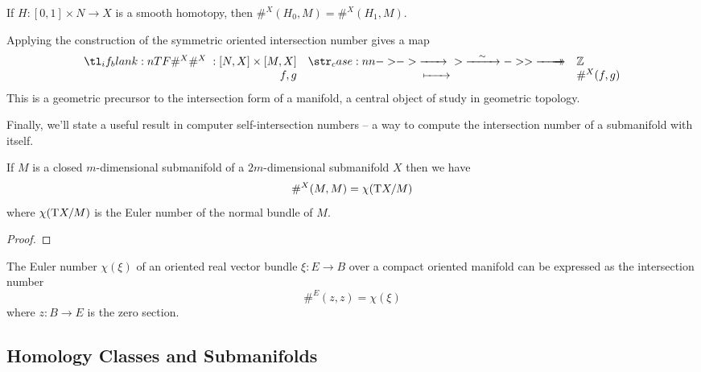 \begin{corollary}
	If $H : [0,1]\times N \to X$ is a smooth homotopy, then $\#^X(H_0, M) = \#^X(H_1, M)$.
\end{corollary}

Applying the construction of the symmetric oriented intersection number gives a map
\begin{equation}\label{eq:oriented-intersection-number-homotopy}
	\lkxfunc{\#^X}{[N,X]\times [M,X]}{\Z}{f,g}{\#^X(f,g)}
\end{equation}
This is a geometric precursor to the intersection form of a manifold, a central object of study in geometric topology. 

Finally, we'll state a useful result in computer self-intersection numbers -- a way to compute the intersection number of a submanifold with itself.

\begin{theorem}\label{thm:euler-number-self-intersection}
	If $M$ is a closed $m$-dimensional submanifold of a $2m$-dimensional submanifold $X$ then we have
	\[
		\#^X(M, M) = \chi(\mathrm{T} X/M)
	\]
	where $\chi(\mathrm{T} X/M)$ is the Euler number of the normal bundle of $M$.
\end{theorem}
\begin{proof}
\end{proof}

\begin{corollary}\label{thm:euler-number-self-intersection-corollary}
	The Euler number $\chi(\xi)$ of an oriented real vector bundle $\xi : E \to B$ over a compact oriented manifold can be expressed as the intersection number
	\[
		\#^E(z,z) = \chi(\xi)
	\]
	where $z : B \to E$ is the zero section.
\end{corollary}

\subsection{Homology Classes and Submanifolds}

